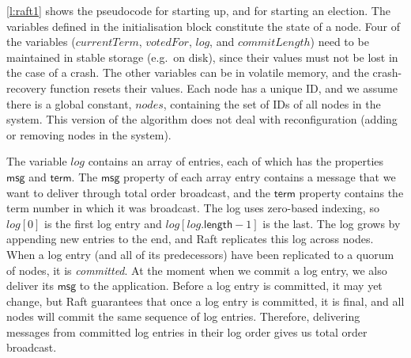 


\autoref{l:raft1} shows the pseudocode for starting up, and for starting an election.
The variables defined in the initialisation block constitute the state of a node.
Four of the variables ($\mathit{currentTerm}$, $\mathit{votedFor}$, $\mathit{log}$, and $\mathit{commitLength}$) need to be maintained in stable storage (e.g.\ on disk), since their values must not be lost in the case of a crash.
The other variables can be in volatile memory, and the crash-recovery function resets their values.
Each node has a unique ID, and we assume there is a global constant, $\mathit{nodes}$, containing the set of IDs of all nodes in the system.
This version of the algorithm does not deal with reconfiguration (adding or removing nodes in the system).

The variable $\mathit{log}$ contains an array of entries, each of which has the properties $\mathsf{msg}$ and $\mathsf{term}$.
The $\mathsf{msg}$ property of each array entry contains a message that we want to deliver through total order broadcast, and the $\mathsf{term}$ property contains the term number in which it was broadcast.
The log uses zero-based indexing, so $\mathit{log}[0]$ is the first log entry and $\mathit{log}[\mathit{log}.\mathsf{length}-1]$ is the last.
The log grows by appending new entries to the end, and Raft replicates this log across nodes.
When a log entry (and all of its predecessors) have been replicated to a quorum of nodes, it is \emph{committed}.
At the moment when we commit a log entry, we also deliver its $\mathsf{msg}$ to the application.
Before a log entry is committed, it may yet change, but Raft guarantees that once a log entry is committed, it is final, and all nodes will commit the same sequence of log entries.
Therefore, delivering messages from committed log entries in their log order gives us total order broadcast.

